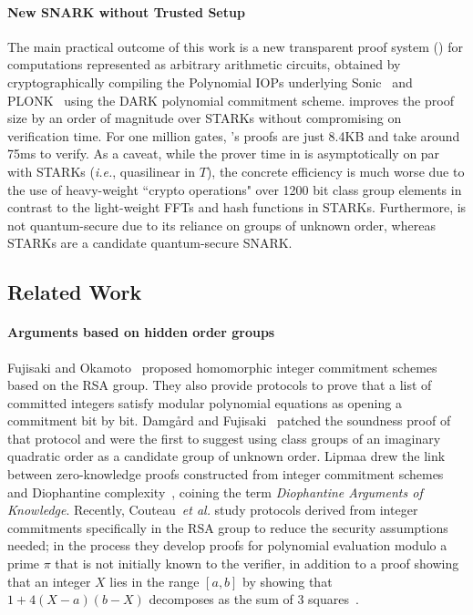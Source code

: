 \paragraph{New SNARK without Trusted Setup}
The main practical outcome of this work is a new transparent proof system () for computations represented as arbitrary arithmetic circuits, obtained by cryptographically compiling the Polynomial IOPs underlying \textsf{Sonic}~\cite{Sonic} and \textsf{PLONK}~\cite{Plonk} using the DARK polynomial commitment scheme.  improves the proof size by an order of magnitude over STARKs without compromising on verification time. For one million gates, 's proofs are just 8.4KB and take around 75ms to verify. 
As a caveat, while the prover time in  is asymptotically on par with STARKs (\emph{i.e.}, quasilinear in $T$), the concrete efficiency is much worse due to the use of heavy-weight ``crypto operations" over 1200 bit class group elements in contrast to the light-weight FFTs and hash functions in STARKs. Furthermore,  is not quantum-secure due to its reliance on groups of unknown order, whereas STARKs are a candidate quantum-secure SNARK. 

\subsection{Related Work}

\paragraph{Arguments based on hidden order groups} 
Fujisaki and Okamoto~\cite{C:FujOka97} proposed homomorphic integer commitment schemes based on the RSA group. They also provide protocols to prove that a list of committed integers satisfy modular polynomial equations as opening a commitment bit by bit. Damgård and Fujisaki~\cite{AC:DamFuj02} patched the soundness proof of that protocol and were the first to suggest using class groups of an imaginary quadratic order as a candidate group of unknown order. Lipmaa drew the link between zero-knowledge proofs constructed from integer commitment schemes and Diophantine complexity~\cite{AC:Lipmaa03a}, coining the term \emph{Diophantine Arguments of Knowledge}. Recently, Couteau~\emph{et al.} study protocols derived from integer commitments specifically in the RSA group to reduce the security assumptions needed; in the process they develop proofs for polynomial evaluation modulo a prime $\pi$ that is not initially known to the verifier, in addition to a proof showing that an integer $X$ lies in the range $[a,b]$ by showing that $1+4(X-a)(b-X)$ decomposes as the sum of 3 squares~\cite{EC:CouPetPoi17}.

